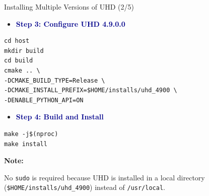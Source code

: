 \begin{frame}[fragile]{Installing Multiple Versions of UHD (2/5)}
\vspace{-0.9cm}
\footnotesize

\begin{itemize}
    \item \textbf{\textcolor{DarkBlue}{Step 3: Configure UHD 4.9.0.0}}
\end{itemize}

\scriptsize

\begin{Verbatim}[xleftmargin=3em,breaklines,breakanywhere]
cd host
mkdir build
cd build
cmake .. \
-DCMAKE_BUILD_TYPE=Release \
-DCMAKE_INSTALL_PREFIX=$HOME/installs/uhd_4900 \
-DENABLE_PYTHON_API=ON
\end{Verbatim}

\vspace{0.5cm}

\begin{itemize}
    \item \textbf{\textcolor{DarkBlue}{Step 4: Build and Install}}
\end{itemize}

\scriptsize

\begin{Verbatim}[xleftmargin=3em]
make -j$(nproc)
make install
\end{Verbatim}

\footnotesize

\textbf{Note:}

No \texttt{sudo} is required because UHD is installed in a local directory
(\texttt{\$HOME/installs/uhd\_4900}) instead of \texttt{/usr/local}.

\end{frame}